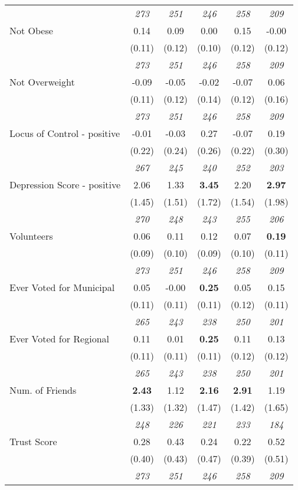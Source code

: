 \begin{tabular}{l c c c c c}
& \textit{ 273 } & \textit{ 251 } & \textit{ 246 } & \textit{ 258 } & \textit{ 209 } \\
Not Obese & 0.14 & 0.09 & 0.00 & 0.15 & -0.00 \\
& (0.11) & (0.12) & (0.10) & (0.12) & (0.12) \\
& \textit{ 273 } & \textit{ 251 } & \textit{ 246 } & \textit{ 258 } & \textit{ 209 } \\
Not Overweight & -0.09 & -0.05 & -0.02 & -0.07 & 0.06 \\
& (0.11) & (0.12) & (0.14) & (0.12) & (0.16) \\
& \textit{ 273 } & \textit{ 251 } & \textit{ 246 } & \textit{ 258 } & \textit{ 209 } \\
Locus of Control - positive & -0.01 & -0.03 & 0.27 & -0.07 & 0.19 \\
& (0.22) & (0.24) & (0.26) & (0.22) & (0.30) \\
& \textit{ 267 } & \textit{ 245 } & \textit{ 240 } & \textit{ 252 } & \textit{ 203 } \\
Depression Score - positive & 2.06 & 1.33 & \textbf{ 3.45 } & 2.20 & \textbf{ 2.97 } \\
& (1.45) & (1.51) & (1.72) & (1.54) & (1.98) \\
& \textit{ 270 } & \textit{ 248 } & \textit{ 243 } & \textit{ 255 } & \textit{ 206 } \\
Volunteers & 0.06 & 0.11 & 0.12 & 0.07 & \textbf{ 0.19 } \\
& (0.09) & (0.10) & (0.09) & (0.10) & (0.11) \\
& \textit{ 273 } & \textit{ 251 } & \textit{ 246 } & \textit{ 258 } & \textit{ 209 } \\
Ever Voted for Municipal & 0.05 & -0.00 & \textbf{ 0.25 } & 0.05 & 0.15 \\
& (0.11) & (0.11) & (0.11) & (0.12) & (0.11) \\
& \textit{ 265 } & \textit{ 243 } & \textit{ 238 } & \textit{ 250 } & \textit{ 201 } \\
Ever Voted for Regional & 0.11 & 0.01 & \textbf{ 0.25 } & 0.11 & 0.13 \\
& (0.11) & (0.11) & (0.11) & (0.12) & (0.12) \\
& \textit{ 265 } & \textit{ 243 } & \textit{ 238 } & \textit{ 250 } & \textit{ 201 } \\
Num. of Friends & \textbf{ 2.43 } & 1.12 & \textbf{ 2.16 } & \textbf{ 2.91 } & 1.19 \\
& (1.33) & (1.32) & (1.47) & (1.42) & (1.65) \\
& \textit{ 248 } & \textit{ 226 } & \textit{ 221 } & \textit{ 233 } & \textit{ 184 } \\
Trust Score & 0.28 & 0.43 & 0.24 & 0.22 & 0.52 \\
& (0.40) & (0.43) & (0.47) & (0.39) & (0.51) \\
& \textit{ 273 } & \textit{ 251 } & \textit{ 246 } & \textit{ 258 } & \textit{ 209 } \\
\bottomrule
\end{tabular}
